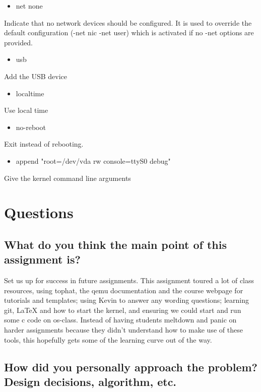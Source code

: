 \documentclass[letterpaper,10pt,titlepage]{article}
\begin{document}
\begin{itemize}
\item net none 
\end{itemize}

 \sloppy Indicate that no network devices should be configured. It is used to override the default configuration (-net nic -net user) which is activated if no -net options are provided. 

\begin{itemize}
\item usb 
\end{itemize}

Add the USB device

\begin{itemize}
\item localtime 
\end{itemize}

Use local time

\begin{itemize}
\item no-reboot 
\end{itemize}

Exit instead of rebooting.

\begin{itemize}
\item append "root=/dev/vda rw console=ttyS0 debug" 
\end{itemize}

Give the kernel command line arguments

\section{Questions}
\subsection{What do you think the main point of this assignment is?}

 \sloppy Set us up for success in future assignments. This assignment toured a lot of class resources, using tophat, the qemu documentation and the course webpage for tutorials and templates; using Kevin to answer any wording questions; learning git, LaTeX and how to start the kernel, and ensuring we could start and run some c code on os-class. Instead of having students meltdown and panic on harder assignments because they didn’t understand how to make use of these tools, this hopefully gets some of the learning curve out of the way.

\subsection{How did you personally approach the problem? Design decisions, algorithm, etc.}
\end{document}
